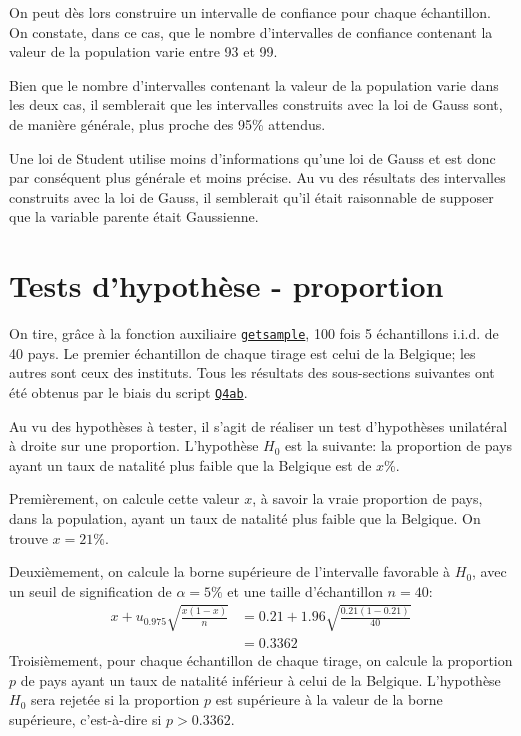 \documentclass[a4paper, 12pt]{article}
\begin{document}
	On peut dès lors construire un intervalle de confiance pour chaque échantillon. On constate, dans ce cas, que le nombre d'intervalles de confiance contenant la valeur de la population varie entre \num{93} et \num{99}.\par
	
	Bien que le nombre d'intervalles contenant la valeur de la population varie dans les deux cas, il semblerait que les intervalles construits avec la loi de Gauss sont, de manière générale, plus proche des \num{95}\% attendus.\par
	
	Une loi de Student utilise moins d'informations qu'une loi de Gauss et est donc par conséquent plus générale et moins précise. Au vu des résultats des intervalles construits avec la loi de Gauss, il semblerait qu'il était raisonnable de supposer que la variable parente était Gaussienne.
	
	
	\section{Tests d'hypothèse - proportion}
	On tire, grâce à la fonction auxiliaire \hyperref[subsec:code-auxiliary]{\texttt{getsample}}, 100 fois 5 échantillons i.i.d. de 40 pays. Le premier échantillon de chaque tirage est celui de la Belgique; les autres sont ceux des instituts. Tous les résultats des sous-sections suivantes ont été obtenus par le biais du script \hyperref[subsec:code-Q4]{\texttt{Q4ab}}.\par
	
	Au vu des hypothèses à tester, il s'agit de réaliser un test d'hypothèses unilatéral à droite sur une proportion. L'hypothèse \(H_0\) est la suivante: \og la proportion de pays ayant un taux de natalité plus faible que la Belgique est de \(x\)\%\fg{}.\par
	
	Premièrement, on calcule cette valeur \(x\), à savoir la vraie proportion de pays, dans la population, ayant un taux de natalité plus faible que la Belgique. On trouve \(x=\num{21}\%\).\par
	
	Deuxièmement, on calcule la borne supérieure de l'intervalle favorable à \(H_0\), avec un seuil de signification de \(\alpha = \num{5}\%\) et une taille d'échantillon \(n = \num{40}\):
	\begin{align*}
	    x + u_{\num{0.975}}\sqrt{\frac{x\left (\num{1}-x\right )}{n}} &= \num{0.21} + \num{1.96}\sqrt{\frac{\num{0.21}\left (\num{1}-\num{0.21}\right)}{\num{40}}}\\
	    &= \num{0.3362}
	\end{align*}
	Troisièmement, pour chaque échantillon de chaque tirage, on calcule la proportion \(p\) de pays ayant un taux de natalité inférieur à celui de la Belgique. L'hypothèse \(H_0\) sera rejetée si la proportion \(p\) est supérieure à la valeur de la borne supérieure, c'est-à-dire si \(p > 0.3362\).\par
	
\end{document}
